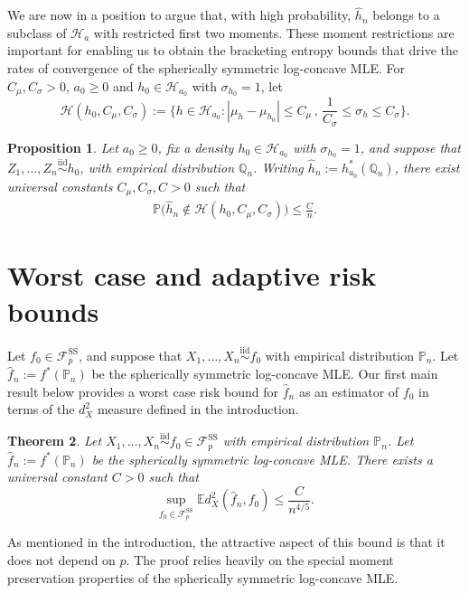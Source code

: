 \documentclass[a4paper,12pt]{article}
\newtheorem{theorem}{Theorem}
\newtheorem{proposition}[theorem]{Proposition}
\begin{document}
We are now in a position to argue that, with high probability, $\hat{h}_n$ belongs to a subclass of $\mathcal{H}_a$ with restricted first two moments.  These moment restrictions are important for enabling us to obtain the bracketing entropy bounds that drive the rates of convergence of the spherically symmetric log-concave MLE.  For $C_\mu,C_\sigma > 0$, $a_0 \geq 0$ and $h_0 \in \mathcal{H}_{a_0}$ with $\sigma_{h_0}=1$, let
\[
\mathcal{H}(h_0,C_\mu,C_\sigma) := \biggl\{h \in \mathcal{H}_{a_0} : |\mu_h - \mu_{h_0}| \leq C_\mu \, , \, \frac{1}{C_\sigma} \leq \sigma_h \leq C_{\sigma}\biggr\}.
\]
\begin{proposition}
  \label{Prop:MLEMeanVarPreservation}
Let $a_0 \geq 0$, fix a density $h_0 \in \mathcal{H}_{a_0}$ with $\sigma_{h_0}=1$, and suppose that $Z_1,\ldots,Z_n \stackrel{\mathrm{iid}}{\sim} h_0$, with empirical distribution $\mathbb{Q}_n$.  Writing $\hat{h}_n := h_{a_0}^*(\mathbb{Q}_n)$, there exist universal constants $C_\mu, C_\sigma, C > 0$ such that
  \begin{align*}
   \mathbb{P}\bigl(\hat{h}_n \notin \mathcal{H}(h_0,C_\mu,C_\sigma)\bigr) \leq \frac{C}{n}.
  \end{align*}
\end{proposition}

\section{Worst case and adaptive risk bounds}
\label{Sec:WorstCase}

Let $f_0 \in \mathcal{F}_p^{\mathrm{SS}}$, and suppose that $X_1,\ldots, X_n \stackrel{\mathrm{iid}}{\sim} f_0$ with empirical distribution $\mathbb{P}_n$. Let $\hat{f}_n := f^*(\mathbb{P}_n)$ be the spherically symmetric log-concave MLE.  Our first main result below provides a worst case risk bound for $\hat{f}_n$ as an estimator of $f_0$ in terms of the $d_X^2$ measure defined in the introduction.
\begin{theorem}
\label{Thm:WorstCase}
Let $X_1,\ldots, X_n \stackrel{\mathrm{iid}}{\sim} f_0 \in \mathcal{F}_p^{\mathrm{SS}}$ with empirical distribution $\mathbb{P}_n$. Let $\hat{f}_n := f^*(\mathbb{P}_n)$ be the spherically symmetric log-concave MLE.  There exists a universal constant $C > 0$ such that 
  \[
\sup_{f_0 \in \mathcal{F}_p^{\mathrm{SS}}} \mathbb{E}d^2_X(\hat{f}_n,f_0) \leq \frac{C}{n^{4/5}}.
  \]
\end{theorem}
As mentioned in the introduction, the attractive aspect of this bound is that it does not depend on $p$.  The proof relies heavily on the special moment preservation properties of the spherically symmetric log-concave MLE.
\end{document}
